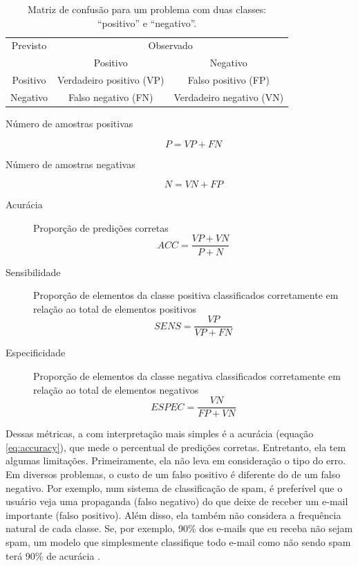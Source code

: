 \documentclass[a4paper,titlepage]{ppgi}\usepackage[]{graphicx}\usepackage[]{color}
\begin{document}
\begin{table}
\centering
\begin{tabular}{c c c}
  Previsto & \multicolumn{2}{c}{Observado} \\  \cline{2-3}
  & \multicolumn{1}{|c}{Positivo} & \multicolumn{1}{c|}{Negativo} \\
  \hline
  \multicolumn{1}{|c|}{Positivo} & Verdadeiro positivo (VP) & \multicolumn{1}{c|}{Falso positivo (FP)} \\
  \multicolumn{1}{|c|}{Negativo} & Falso negativo (FN) & \multicolumn{1}{c|}{Verdadeiro negativo (VN)} \\
  \hline
\end{tabular}
\caption{Matriz de confusão para um problema com duas classes: ``positivo'' e
``negativo''.}
\label{table:exemplo-matriz-de-confusao}
\end{table}

\begin{description}
\item[Número de amostras positivas]
\begin{equation}
\label{eq:positive-rate}
P = VP + FN
\end{equation}
\item[Número de amostras negativas]
\begin{equation}
\label{eq:negative-rate}
N = VN + FP
\end{equation}
\item[Acurácia] Proporção de predições corretas
\begin{equation}
\label{eq:accuracy}
ACC = \frac{VP + VN}{P + N}
\end{equation}
\item[Sensibilidade] Proporção de elementos da classe positiva classificados
corretamente em relação ao total de elementos positivos
\begin{equation}
\label{eq:sensitivity}
SENS = \frac{VP}{VP + FN}
\end{equation}
\item[Especificidade] Proporção de elementos da classe negativa classificados
corretamente em relação ao total de elementos negativos
\begin{equation}
\label{eq:specificity}
ESPEC = \frac{VN}{FP + VN}
\end{equation}
\end{description}

Dessas métricas, a com interpretação mais simples é a acurácia (equação
\ref{eq:accuracy}), que mede o percentual de predições corretas. Entretanto,
ela tem algumas limitações. Primeiramente, ela não leva em consideração o tipo
do erro. Em diversos problemas, o custo de um falso positivo é diferente do de
um falso negativo. Por exemplo, num sistema de classificação de spam, é
preferível que o usuário veja uma propaganda (falso negativo) do que deixe de
receber um e-mail importante (falso positivo). Além disso, ela também não
considera a frequência natural de cada classe. Se, por exemplo, 90\% dos
e-mails que eu receba não sejam spam, um modelo que simplesmente classifique
todo e-mail como não sendo spam terá 90\% de acurácia \cite{Kuhn2013}.
\end{document}
